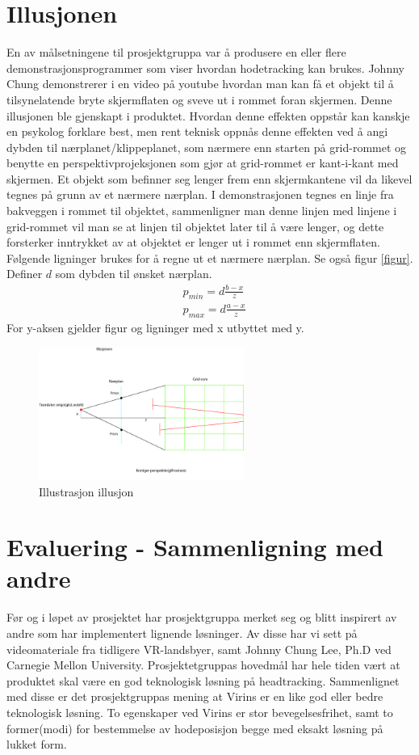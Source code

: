 \documentclass{report}
\begin{document}
\section{Illusjonen}
En av målsetningene til prosjektgruppa var å produsere en eller flere demonstrasjonsprogrammer
som viser hvordan hodetracking kan brukes. Johnny Chung demonstrerer i en video på youtube
hvordan man kan få et objekt til å tilsynelatende bryte skjermflaten og sveve ut i rommet foran skjermen.
Denne illusjonen ble gjenskapt i produktet. Hvordan denne effekten oppstår kan kanskje en psykolog forklare
best, men rent teknisk oppnås denne effekten ved å angi dybden til nærplanet/klippeplanet, som nærmere enn
starten på grid-rommet og benytte en perspektivprojeksjonen som gjør at grid-rommet er kant-i-kant med skjermen.
Et objekt som befinner seg lenger frem enn skjermkantene vil da likevel tegnes på grunn av et nærmere nærplan.
I demonstrasjonen tegnes en linje fra bakveggen i rommet til objektet, sammenligner man denne linjen med linjene
i grid-rommet vil man se at linjen til objektet later til å være lenger, og dette forsterker inntrykket av at
objektet er lenger ut i rommet enn skjermflaten. 
Følgende ligninger brukes for å regne ut et nærmere nærplan. Se også figur \ref{figur}.
Definer $d$ som dybden til ønsket nærplan.
\begin{eqnarray}
&p_{min} = d\frac{b-x}{z}\\
&p_{max} = d\frac{a-x}{z}
\end{eqnarray}
For y-aksen gjelder figur og ligninger med x utbyttet med y.

	\begin{figure}[h]
	\centering
	\includegraphics[width=0.60\textwidth]{graphics/Illusjonen.jpg}
	\caption{Illustrasjon illusjon}
	\label{fig:illusjon}
	\end{figure}

\section{Evaluering - Sammenligning med andre}
Før og i  løpet av prosjektet har prosjektgruppa merket seg og blitt inspirert av andre som har implementert lignende
løsninger. Av disse har vi sett på videomateriale fra tidligere VR-landsbyer, samt Johnny Chung Lee, Ph.D ved Carnegie Mellon University.
Prosjektetgruppas hovedmål har hele tiden vært at produktet skal være en god teknologisk løsning på headtracking.
Sammenlignet med disse er det prosjektgruppas mening at Virins er en like god eller bedre teknologisk løsning.
To egenskaper ved Virins er stor bevegelsesfrihet, samt to former(modi) for bestemmelse av hodeposisjon begge med eksakt løsning på lukket form.
\end{document}
